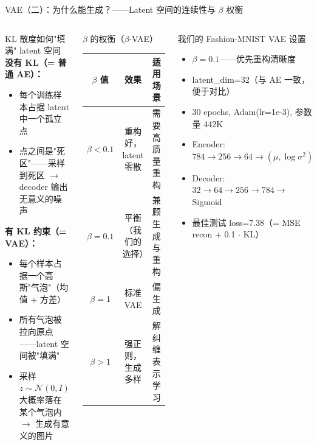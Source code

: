\documentclass[aspectratio=169]{ctexbeamer}
\begin{document}
\begin{frame}[shrink=20]{VAE（二）：为什么能生成？——Latent 空间的连续性与 $\beta$ 权衡}
\small

\begin{columns}[T]
\begin{block}{KL 散度如何"填满" latent 空间}
\footnotesize
\textbf{没有 KL（= 普通 AE）：}
\begin{itemize}
  \item 每个训练样本占据 latent 中一个孤立点
  \item 点之间是"死区"——采样到死区 $\to$ decoder 输出无意义的噪声
\end{itemize}

\textbf{有 KL 约束（= VAE）：}
\begin{itemize}
  \item 每个样本占据一个高斯"气泡"（均值 + 方差）
  \item 所有气泡被拉向原点——latent 空间被"填满"
  \item 采样 $z \sim \mathcal{N}(0,I)$ 大概率落在某个气泡内 $\to$ 生成有意义的图片
\end{itemize}
\end{block}

\vspace{0.1cm}

\begin{block}{$\beta$ 的权衡（$\beta$-VAE）}
\footnotesize
\centering
\begin{tabular}{c c c}
\toprule
$\beta$ 值 & 效果 & 适用场景 \\
\midrule
$\beta < 0.1$ & 重构好，latent 零散 & 需要高质量重构 \\
$\beta = 0.1$ & 平衡（我们的选择） & 兼顾生成与重构 \\
$\beta = 1$   & 标准 VAE & 偏生成 \\
$\beta > 1$   & 强正则，生成多样 & 解纠缠表示学习 \\
\bottomrule
\end{tabular}
\end{block}

\begin{block}{我们的 Fashion-MNIST VAE 设置}
\footnotesize
\begin{itemize}
  \item $\beta=0.1$——优先重构清晰度
  \item latent\_dim=32（与 AE 一致，便于对比）
  \item 30 epochs, Adam(lr=1e-3), 参数量 442K
  \item Encoder: $784 \to 256 \to 64 \to (\mu, \log\sigma^2)$
  \item Decoder: $32 \to 64 \to 256 \to 784 \to$ Sigmoid
  \item 最佳测试 loss=7.38（= MSE recon + 0.1 $\cdot$ KL）
\end{itemize}
\end{block}


\end{columns}
\end{frame}
\end{document}
